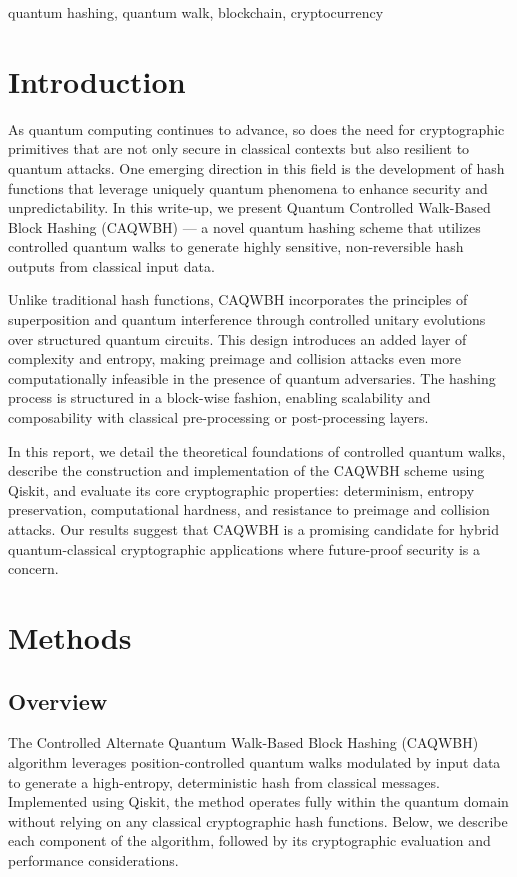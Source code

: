 \documentclass[conference]{IEEEtran}
\begin{document}
\begin{IEEEkeywords}
quantum hashing, quantum walk, blockchain, cryptocurrency
\end{IEEEkeywords}

\section{Introduction}
As quantum computing continues to advance, so does the need for cryptographic primitives that are not only secure in classical contexts but also resilient to quantum attacks. One emerging direction in this field is the development of hash functions that leverage uniquely quantum phenomena to enhance security and unpredictability. In this write-up, we present Quantum Controlled Walk-Based Block Hashing (CAQWBH) — a novel quantum hashing scheme that utilizes controlled quantum walks to generate highly sensitive, non-reversible hash outputs from classical input data.

Unlike traditional hash functions, CAQWBH incorporates the principles of superposition and quantum interference through controlled unitary evolutions over structured quantum circuits. This design introduces an added layer of complexity and entropy, making preimage and collision attacks even more computationally infeasible in the presence of quantum adversaries. The hashing process is structured in a block-wise fashion, enabling scalability and composability with classical pre-processing or post-processing layers.

In this report, we detail the theoretical foundations of controlled quantum walks, describe the construction and implementation of the CAQWBH scheme using Qiskit, and evaluate its core cryptographic properties: determinism, entropy preservation, computational hardness, and resistance to preimage and collision attacks. Our results suggest that CAQWBH is a promising candidate for hybrid quantum-classical cryptographic applications where future-proof security is a concern.


\section{Methods}

\subsection{Overview}

The Controlled Alternate Quantum Walk-Based Block Hashing (CAQWBH) algorithm leverages position-controlled quantum walks modulated by input data to generate a high-entropy, deterministic hash from classical messages. Implemented using Qiskit, the method operates fully within the quantum domain without relying on any classical cryptographic hash functions. Below, we describe each component of the algorithm, followed by its cryptographic evaluation and performance considerations.
\end{document}
